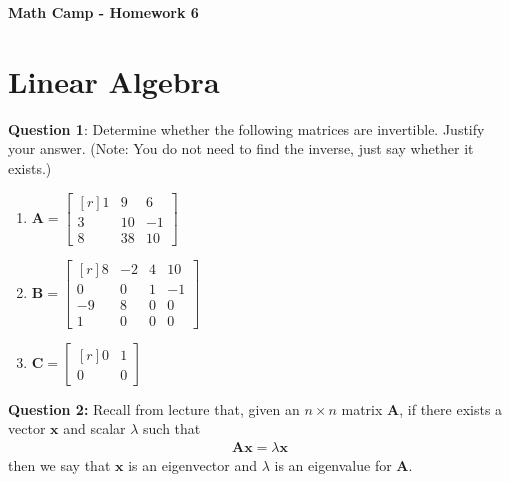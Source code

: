 \documentclass[10pt]{amsart}
\begin{document}
\centerline{\bf Math Camp - Homework 6}

\section{Linear Algebra}

\textbf{Question 1}: Determine  whether the following matrices are invertible. Justify your answer. (Note: You do not need to find the inverse, just say whether it exists.)

\begin{multicols}{3}
\begin{enumerate}
	\item $\mathbf{A} = \left[\begin{matrix*}[r]
	1 & 9 & 6 \\
	3 & 10 & -1 \\
	8 & 38 & 10
	\end{matrix*}\right]$

	\item $\mathbf{B} = \left[\begin{matrix*}[r]
	8 & -2 & 4 & 10 \\
	0 & 0 & 1 & -1 \\
	-9 & 8 & 0 & 0 \\
	1 & 0 & 0 & 0
	\end{matrix*}\right]$

	\item $\mathbf{C} = \left[\begin{matrix*}[r]
	0 & 1 \\
	0 & 0
	\end{matrix*}\right]$
\end{enumerate}
\end{multicols}

\bigskip

\textbf{Question 2:} Recall from lecture that, given an $n\times n$ matrix $\mathbf{A}$, if there exists a vector $\mathbf{x}$ and scalar $\lambda$ such that 
\begin{eqnarray*}
\mathbf{A}\mathbf{x} = \lambda \mathbf{x}
\end{eqnarray*}
then we say that $\mathbf{x}$ is an eigenvector and $\lambda$ is an eigenvalue for $\mathbf{A}$. 
\end{document}
